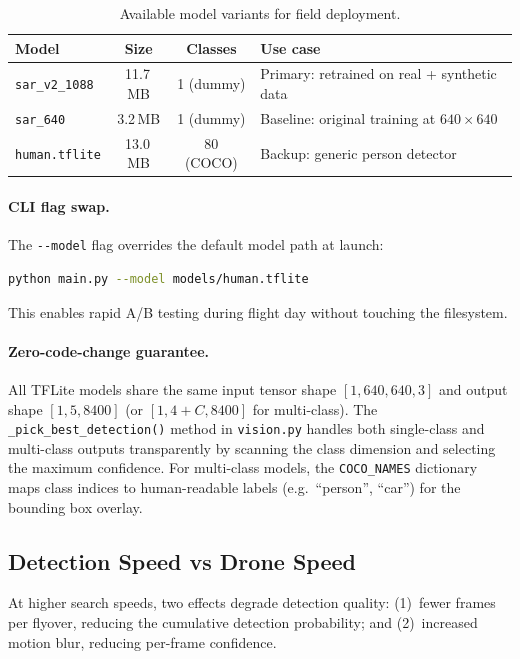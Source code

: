 \begin{table}[ht]
  \centering
  \caption{Available model variants for field deployment.}\label{tab:model_variants}
  \begin{tabular}{@{}l c c l@{}}
    \toprule
    \textbf{Model} & \textbf{Size} & \textbf{Classes} & \textbf{Use case} \\
    \midrule
    \texttt{sar\_v2\_1088} & 11.7\,MB & 1 (dummy) & Primary: retrained on real + synthetic data \\
    \texttt{sar\_640}       & 3.2\,MB  & 1 (dummy) & Baseline: original training at $640\!\times\!640$ \\
    \texttt{human.tflite}   & 13.0\,MB & 80 (COCO) & Backup: generic person detector \\
    \bottomrule
  \end{tabular}
\end{table}

\paragraph{CLI flag swap.}
The \texttt{-{}-model} flag overrides the default model path at launch:
\begin{lstlisting}[language=bash,numbers=none]
python main.py --model models/human.tflite
\end{lstlisting}
This enables rapid A/B testing during flight day without touching the filesystem.

\paragraph{Zero-code-change guarantee.}
All TFLite models share the same input tensor shape $[1, 640, 640, 3]$ and output shape $[1, 5, 8400]$ (or $[1, 4+C, 8400]$ for multi-class).  The \texttt{\_pick\_best\_detection()} method in \texttt{vision.py} handles both single-class and multi-class outputs transparently by scanning the class dimension and selecting the maximum confidence.  For multi-class models, the \texttt{COCO\_NAMES} dictionary maps class indices to human-readable labels (e.g.\ ``person'', ``car'') for the bounding box overlay.

\subsection{Detection Speed vs Drone Speed}\label{app:cv:speed}

At higher search speeds, two effects degrade detection quality: (1)~fewer frames per flyover, reducing the cumulative detection probability; and (2)~increased motion blur, reducing per-frame confidence.

